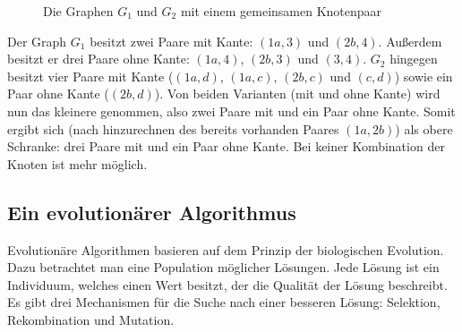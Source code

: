 \begin{figure}[htb]
\centering
\hspace*{\fill}
\hspace*{\fill}
\hspace*{\fill}
\caption{Die Graphen $G_1$ und $G_2$ mit einem gemeinsamen Knotenpaar}
\label{pic:bsp_BB_Bound}
\end{figure}

Der Graph $G_1$ besitzt zwei Paare mit Kante: $(1a,3)$ und $(2b,4)$. Außerdem 
besitzt er drei Paare ohne Kante: $(1a,4)$, $(2b,3)$ und $(3,4)$. 
$G_2$ hingegen besitzt vier Paare mit Kante ($(1a,d)$, $(1a,c)$, $(2b,c)$ 
und $(c,d)$) sowie ein Paar ohne Kante ($(2b,d)$). Von beiden Varianten 
(mit und ohne Kante) wird nun das kleinere genommen, also zwei Paare mit 
und ein Paar ohne Kante. Somit ergibt sich (nach hinzurechnen des bereits 
vorhanden Paares $(1a,2b)$) als obere Schranke: drei Paare mit 
und ein Paar ohne Kante. Bei keiner Kombination der Knoten ist mehr möglich.


\subsection{Ein evolutionärer Algorithmus}
Evolutionäre Algorithmen basieren auf dem Prinzip der biologischen 
Evolution. Dazu betrachtet man eine Population möglicher Lösungen. 
Jede Lösung ist ein Individuum, welches einen Wert besitzt, 
der die Qualität der Lösung beschreibt. Es gibt drei Mechanismen für die Suche nach 
einer besseren Lösung: Selektion, Rekombination und Mutation. 

